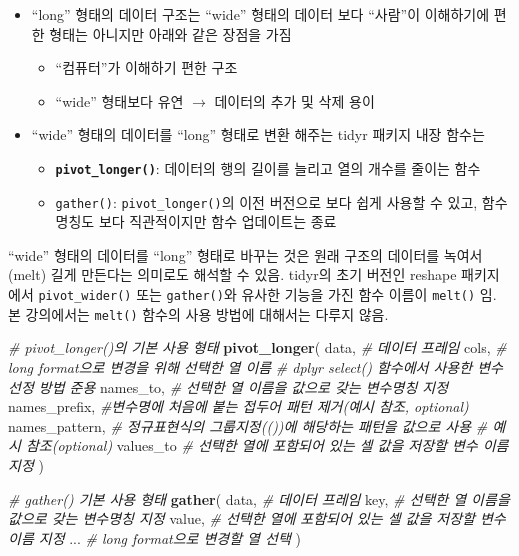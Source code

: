 \documentclass[
  11pt,
]{krantz}
\makeatletter
\newenvironment{Shaded}{\begin{snugshade}}{\end{snugshade}}
\newcommand{\CommentTok}[1]{\textcolor[rgb]{0.37,0.37,0.37}{\textit{#1}}}
\newcommand{\KeywordTok}[1]{\textcolor[rgb]{0.27,0.27,0.27}{\textbf{#1}}}
\newcommand{\NormalTok}[1]{#1}
\providecommand{\tightlist}{%
  \setlength{\itemsep}{0pt}\setlength{\parskip}{0pt}}
\newenvironment{kframe}{%
\medskip{}
\setlength{\fboxsep}{.8em}
 \def\at@end@of@kframe{}%
 \ifinner\ifhmode%
  \def\at@end@of@kframe{\end{minipage}}%
  \begin{minipage}{\columnwidth}%
 \fi\fi%
 \def\FrameCommand##1{\hskip\@totalleftmargin \hskip-\fboxsep
 \colorbox{shadecolor}{##1}\hskip-\fboxsep
     \hskip-\linewidth \hskip-\@totalleftmargin \hskip\columnwidth}%
 \MakeFramed {\advance\hsize-\width
   \@totalleftmargin\z@ \linewidth\hsize
   \@setminipage}}%
 {\par\unskip\endMakeFramed%
 \at@end@of@kframe}
\renewenvironment{quote}{\begin{kframe}}{\end{kframe}}
\makeatother
\begin{document}
\begin{itemize}
\tightlist
\item
  ``long'' 형태의 데이터 구조는 ``wide'' 형태의 데이터 보다 ``사람''이 이해하기에 편한 형태는 아니지만 아래와 같은 장점을 가짐

  \begin{itemize}
  \tightlist
  \item
    ``컴퓨터''가 이해하기 편한 구조
  \item
    ``wide'' 형태보다 유연 \(\rightarrow\) 데이터의 추가 및 삭제 용이
  \end{itemize}
\item
  ``wide'' 형태의 데이터를 ``long'' 형태로 변환 해주는 tidyr 패키지 내장 함수는

  \begin{itemize}
  \tightlist
  \item
    \textbf{\texttt{pivot\_longer()}}: 데이터의 행의 길이를 늘리고 열의 개수를 줄이는 함수
  \item
    \texttt{gather()}: \texttt{pivot\_longer()}의 이전 버전으로 보다 쉽게 사용할 수 있고, 함수 명칭도 보다 직관적이지만 함수 업데이트는 종료
  \end{itemize}
\end{itemize}

\begin{quote}
``wide'' 형태의 데이터를 ``long'' 형태로 바꾸는 것은 원래 구조의 데이터를 녹여서(melt) 길게 만든다는 의미로도 해석할 수 있음. tidyr의 초기 버전인 reshape 패키지에서 \texttt{pivot\_wider()} 또는 \texttt{gather()}와 유사한 기능을 가진 함수 이름이 \texttt{melt()} 임. 본 강의에서는 \texttt{melt()} 함수의 사용 방법에 대해서는 다루지 않음.
\end{quote}

\footnotesize

\begin{Shaded}
\begin{Highlighting}[]
\CommentTok{# pivot_longer()의 기본 사용 형태}
\KeywordTok{pivot_longer}\NormalTok{(}
\NormalTok{  data, }\CommentTok{# 데이터 프레임}
\NormalTok{  cols, }\CommentTok{# long format으로 변경을 위해 선택한 열 이름}
        \CommentTok{# dplyr select() 함수에서 사용한 변수선정 방법 준용}
\NormalTok{  names_to, }\CommentTok{# 선택한 열 이름을 값으로 갖는 변수명칭 지정}
\NormalTok{  names_prefix, }\CommentTok{#변수명에 처음에 붙는 접두어 패턴 제거(예시 참조, optional)}
\NormalTok{  names_pattern, }\CommentTok{# 정규표현식의 그룹지정(())에 해당하는 패턴을 값으로 사용}
                 \CommentTok{# 예시 참조(optional)}
\NormalTok{  values_to }\CommentTok{# 선택한 열에 포함되어 있는 셀 값을 저장할 변수 이름 지정}
\NormalTok{)}

\CommentTok{# gather() 기본 사용 형태}
\KeywordTok{gather}\NormalTok{(}
\NormalTok{  data, }\CommentTok{# 데이터 프레임}
\NormalTok{  key, }\CommentTok{# 선택한 열 이름을 값으로 갖는 변수명칭 지정}
\NormalTok{  value, }\CommentTok{# 선택한 열에 포함되어 있는 셀 값을 저장할 변수 이름 지정}
\NormalTok{  ... }\CommentTok{# long format으로 변경할 열 선택}
\NormalTok{)}
\end{Highlighting}
\end{Shaded}
\end{document}
